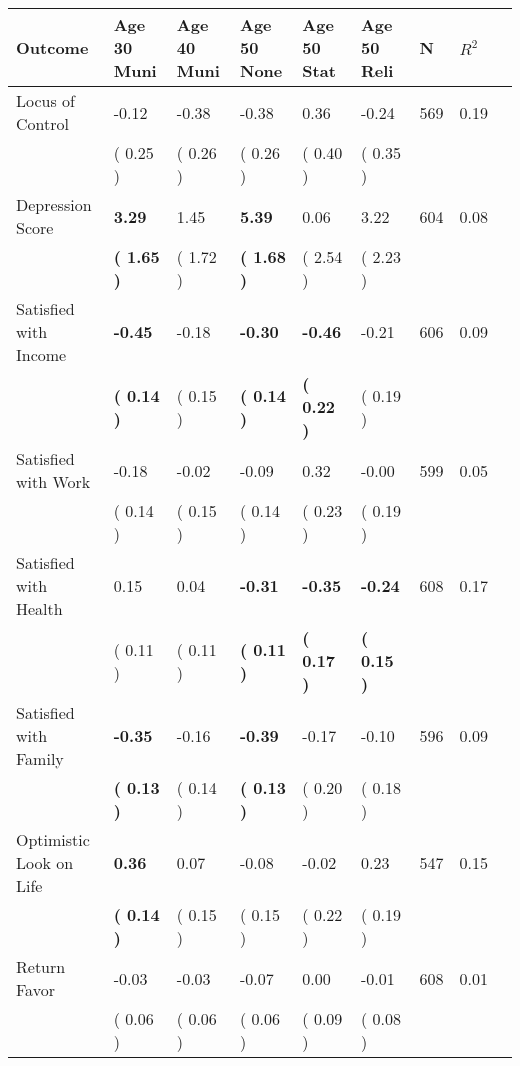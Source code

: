 \begin{tabular}{L{6.2cm} C{1.8cm} C{1.8cm} C{1.8cm} C{1.8cm} C{1.8cm} C{1.8cm} C{0.3cm} C{0.3cm}}
\toprule
 \textbf{Outcome} & \textbf{Age 30 Muni} & \textbf{Age 40 Muni} & \textbf{Age 50 None} & \textbf{Age 50 Stat} & \textbf{Age 50 Reli} & \textbf{N} & \textbf{$ R^2$} \\
\midrule
Locus of Control &     -0.12 &     -0.38 &     -0.38 &      0.36 &     -0.24  & 569 &       0.19 \\ 
 & (     0.25 ) & (     0.26 ) & (     0.26 ) & (     0.40 ) & (     0.35 )  & \\
Depression Score & \textbf{     3.29} &      1.45 & \textbf{     5.39} &      0.06 &      3.22  & 604 &       0.08 \\ 
 & \textbf{(     1.65 )} & (     1.72 ) & \textbf{(     1.68 )} & (     2.54 ) & (     2.23 )  & \\
Satisfied with Income & \textbf{    -0.45} &     -0.18 & \textbf{    -0.30} & \textbf{    -0.46} &     -0.21  & 606 &       0.09 \\ 
 & \textbf{(     0.14 )} & (     0.15 ) & \textbf{(     0.14 )} & \textbf{(     0.22 )} & (     0.19 )  & \\
Satisfied with Work &     -0.18 &     -0.02 &     -0.09 &      0.32 &     -0.00  & 599 &       0.05 \\ 
 & (     0.14 ) & (     0.15 ) & (     0.14 ) & (     0.23 ) & (     0.19 )  & \\
Satisfied with Health &      0.15 &      0.04 & \textbf{    -0.31} & \textbf{    -0.35} & \textbf{    -0.24}  & 608 &       0.17 \\ 
 & (     0.11 ) & (     0.11 ) & \textbf{(     0.11 )} & \textbf{(     0.17 )} & \textbf{(     0.15 )}  & \\
Satisfied with Family & \textbf{    -0.35} &     -0.16 & \textbf{    -0.39} &     -0.17 &     -0.10  & 596 &       0.09 \\ 
 & \textbf{(     0.13 )} & (     0.14 ) & \textbf{(     0.13 )} & (     0.20 ) & (     0.18 )  & \\
Optimistic Look on Life & \textbf{     0.36} &      0.07 &     -0.08 &     -0.02 &      0.23  & 547 &       0.15 \\ 
 & \textbf{(     0.14 )} & (     0.15 ) & (     0.15 ) & (     0.22 ) & (     0.19 )  & \\
Return Favor &     -0.03 &     -0.03 &     -0.07 &      0.00 &     -0.01  & 608 &       0.01 \\ 
 & (     0.06 ) & (     0.06 ) & (     0.06 ) & (     0.09 ) & (     0.08 )  & \\

\end{tabular}
